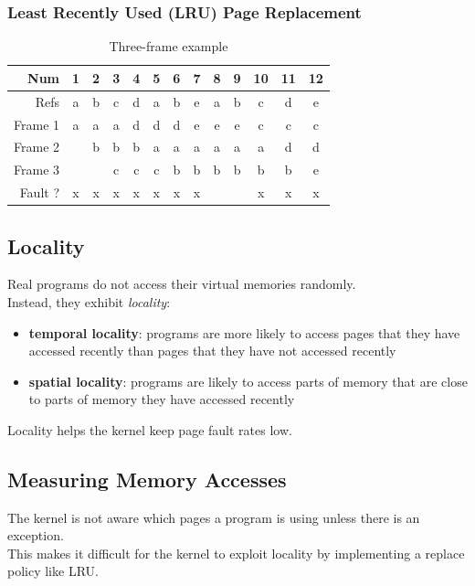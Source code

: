 \documentclass[12pt]{article}
\theoremstyle{plain}
\theoremstyle{definition}
\begin{document}
\subsubsection{Least Recently Used (LRU) Page Replacement}
\begin{table}[H]
  \vspace{-20pt}
  \caption{Three-frame example}
  \centering
  \begin{tabular}{|r|c|c|c|c|c|c|c|c|c|c|c|c|}
  \hline
  Num & 1 & 2 & 3 & 4 & 5 & 6 & 7 & 8 & 9 & 10 & 11 & 12 \\ \hline
  Refs & a & b & c & d & a & b & e & a & b & c & d & e \\ \hline
  \hline
  Frame 1 & a & a & a & d & d & d & e & e & e & c & c & c \\ \hline
  Frame 2 &  & b & b & b & a & a & a & a & a & a & d & d \\ \hline
  Frame 3 &  &  & c & c & c & b & b & b & b & b & b & e \\ \hline
  Fault ? & x & x & x & x & x & x & x &  &  & x & x & x \\ \hline
  \end{tabular}
\end{table}

\subsection{Locality}
Real programs do not access their virtual memories randomly. \\
Instead, they exhibit \emph{locality}:
\begin{itemize}
  \item \textbf{temporal locality}: programs are more likely to access pages that they have accessed recently than pages that they have not accessed recently
  \item \textbf{spatial locality}: programs are likely to access parts of memory that are close to parts of memory they have accessed recently
\end{itemize}

Locality helps the kernel keep page fault rates low.

\subsection{Measuring Memory Accesses}
The kernel is not aware which pages a program is using unless there is an exception. \\
This makes it difficult for the kernel to exploit locality by implementing a replace policy like LRU. \\
\end{document}
